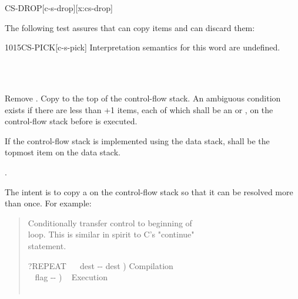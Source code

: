 \begin{worddef*}{}{CS-DROP}[c-s-drop][x:cs-drop]
\begin{testing}

		The following test assures that  can copy  items
		and  can discard them:

	\end{testing}
\end{worddef*}

\begin{worddef}{1015}{CS-PICK}[c-s-pick]
\interpret
	Interpretation semantics for this word are undefined.

\execute
\cbstart{}%
	 \\
	 \\
\cbend

	Remove . Copy  to the top of the
	control-flow stack. An ambiguous condition exists if there
	are less than +1 items, each of which shall be an
	 or , on the control-flow stack
	before  is executed.

	If the control-flow stack is implemented using the data stack,
	 shall be the topmost item on the data stack.

\see {}.

	\begin{rationale} %
		The intent is to copy a  on the control-flow
		stack so that it can be resolved more than once. For example:
		\begin{quote}\ttfamily
			 Conditionally transfer control to beginning of \\
			 loop.  This is similar in spirit to C's "continue" \\
			 statement.

			\word{:} ?REPEAT ~~ dest -{}- dest )  Compilation \\
			\tab\tab\tab~ flag -{}- ) \tab~ Execution \\
			  ~   \\
			\word{;} 


\end{quote}
\end{rationale}
\end{worddef}
